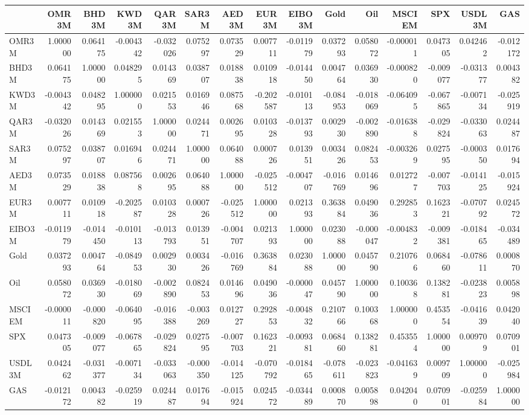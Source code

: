 \begin{tabular}{lrrrrrrrrrrrrrr}
\toprule
 & OMR3M & BHD3M & KWD3M & QAR3M & SAR3M & AED3M & EUR3M & EIBO3M & Gold & Oil & MSCI EM & SPX & USDL3M & GAS \\
\midrule
OMR3M & 1.000000 & 0.064175 & -0.004342 & -0.032026 & 0.075297 & 0.073529 & 0.007711 & -0.011979 & 0.037293 & 0.058072 & -0.000011 & 0.047305 & 0.042462 & -0.012172 \\
BHD3M & 0.064175 & 1.000000 & 0.048295 & 0.014369 & 0.038707 & 0.018838 & 0.010918 & -0.014450 & 0.004764 & 0.036930 & -0.000820 & -0.009077 & -0.031377 & 0.004382 \\
KWD3M & -0.004342 & 0.048295 & 1.000000 & 0.021553 & 0.016946 & 0.087568 & -0.202587 & -0.010113 & -0.084953 & -0.018069 & -0.064095 & -0.067865 & -0.007134 & -0.025919 \\
QAR3M & -0.032026 & 0.014369 & 0.021553 & 1.000000 & 0.024471 & 0.002695 & 0.010328 & -0.013793 & 0.002930 & -0.002890 & -0.016388 & -0.029824 & -0.033063 & 0.024487 \\
SAR3M & 0.075297 & 0.038707 & 0.016946 & 0.024471 & 1.000000 & 0.064088 & 0.000726 & 0.013951 & 0.003426 & 0.082453 & -0.003269 & 0.027595 & -0.000350 & 0.017694 \\
AED3M & 0.073529 & 0.018838 & 0.087568 & 0.002695 & 0.064088 & 1.000000 & -0.025512 & -0.004707 & -0.016769 & 0.014696 & 0.012727 & -0.007703 & -0.014125 & -0.015924 \\
EUR3M & 0.007711 & 0.010918 & -0.202587 & 0.010328 & 0.000726 & -0.025512 & 1.000000 & 0.021393 & 0.363884 & 0.049036 & 0.292853 & 0.162321 & -0.070792 & 0.024572 \\
EIBO3M & -0.011979 & -0.014450 & -0.010113 & -0.013793 & 0.013951 & -0.004707 & 0.021393 & 1.000000 & 0.023088 & -0.000047 & -0.004832 & -0.009381 & -0.018465 & -0.034489 \\
Gold & 0.037293 & 0.004764 & -0.084953 & 0.002930 & 0.003426 & -0.016769 & 0.363884 & 0.023088 & 1.000000 & 0.045790 & 0.210766 & 0.068460 & -0.078611 & 0.000870 \\
Oil & 0.058072 & 0.036930 & -0.018069 & -0.002890 & 0.082453 & 0.014696 & 0.049036 & -0.000047 & 0.045790 & 1.000000 & 0.100368 & 0.138281 & -0.023823 & 0.005898 \\
MSCI EM & -0.000011 & -0.000820 & -0.064095 & -0.016388 & -0.003269 & 0.012727 & 0.292853 & -0.004832 & 0.210766 & 0.100368 & 1.000000 & 0.453554 & -0.041639 & 0.042040 \\
SPX & 0.047305 & -0.009077 & -0.067865 & -0.029824 & 0.027595 & -0.007703 & 0.162321 & -0.009381 & 0.068460 & 0.138281 & 0.453554 & 1.000000 & 0.009709 & 0.070901 \\
USDL3M & 0.042462 & -0.031377 & -0.007134 & -0.033063 & -0.000350 & -0.014125 & -0.070792 & -0.018465 & -0.078611 & -0.023823 & -0.041639 & 0.009709 & 1.000000 & -0.025984 \\
GAS & -0.012172 & 0.004382 & -0.025919 & 0.024487 & 0.017694 & -0.015924 & 0.024572 & -0.034489 & 0.000870 & 0.005898 & 0.042040 & 0.070901 & -0.025984 & 1.000000 \\
\bottomrule
\end{tabular}
